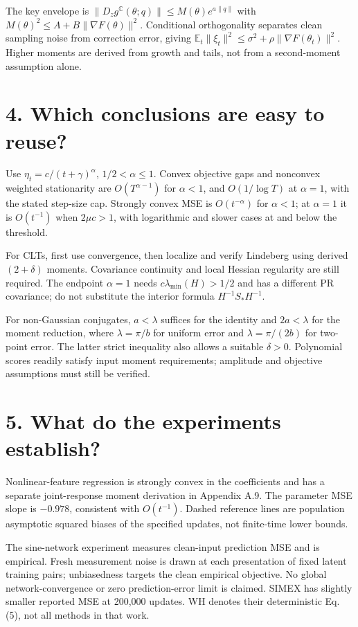 \documentclass[11pt]{article}
\begin{document}
The key envelope is $\|D_zg^{\mathbb C}(\theta;q)\|\le M(\theta)e^{a\|q\|}$ with $M(\theta)^2\le A+B\|\nabla F(\theta)\|^2$. Conditional orthogonality separates clean sampling noise from correction error, giving $\mathbb E_t\|\xi_t\|^2\le\sigma^2+\rho\|\nabla F(\theta_t)\|^2$. Higher moments are derived from growth and tails, not from a second-moment assumption alone.


\clearpage

\section*{4. Which conclusions are easy to reuse?}
Use $\eta_t=c/(t+\gamma)^\alpha$, $1/2<\alpha\le1$. Convex objective gaps and nonconvex weighted stationarity are $O(T^{\alpha-1})$ for $\alpha<1$, and $O(1/\log T)$ at $\alpha=1$, with the stated step-size cap. Strongly convex MSE is $O(t^{-\alpha})$ for $\alpha<1$; at $\alpha=1$ it is $O(t^{-1})$ when $2\mu c>1$, with logarithmic and slower cases at and below the threshold.

For CLTs, first use convergence, then localize and verify Lindeberg using derived $(2+\delta)$ moments. Covariance continuity and local Hessian regularity are still required. The endpoint $\alpha=1$ needs $c\lambda_{\min}(H)>1/2$ and has a different PR covariance; do not substitute the interior formula $H^{-1}S_*H^{-1}$.

For non-Gaussian conjugates, $a<\lambda$ suffices for the identity and $2a<\lambda$ for the moment reduction, where $\lambda=\pi/b$ for uniform error and $\lambda=\pi/(2b)$ for two-point error. The latter strict inequality also allows a suitable $\delta>0$. Polynomial scores readily satisfy input moment requirements; amplitude and objective assumptions must still be verified.


\section*{5. What do the experiments establish?}
Nonlinear-feature regression is strongly convex in the coefficients and has a separate joint-response moment derivation in Appendix A.9. The parameter MSE slope is $-0.978$, consistent with $O(t^{-1})$. Dashed reference lines are population asymptotic squared biases of the specified updates, not finite-time lower bounds.

The sine-network experiment measures clean-input prediction MSE and is empirical. Fresh measurement noise is drawn at each presentation of fixed latent training pairs; unbiasedness targets the clean empirical objective. No global network-convergence or zero prediction-error limit is claimed. SIMEX has slightly smaller reported MSE at 200,000 updates. WH denotes their deterministic Eq. (5), not all methods in that work.
\end{document}
